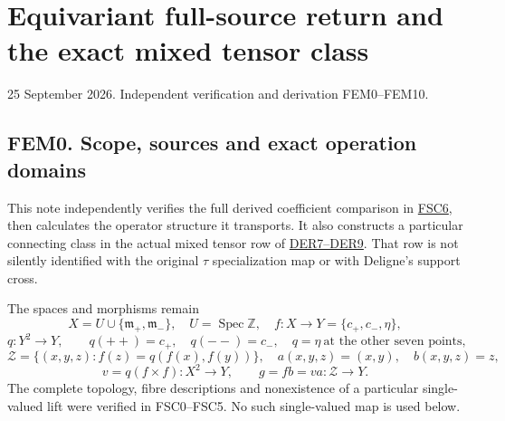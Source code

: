 \chapter{Equivariant full-source return and the exact mixed tensor
class}\label{equivariant-full-source-return-and-the-exact-mixed-tensor-class}

25 September 2026. Independent verification and derivation FEM0--FEM10.

\section{FEM0. Scope, sources and exact operation
domains}\label{fem0.-scope-sources-and-exact-operation-domains}

This note independently verifies the full derived coefficient comparison
in
\href{https://github.com/KokunoYumeto/zeta-function-research-reader/blob/main/workbenches/splitzero-tandem/continuations/20260925-full-source-tensor-and-original-divisor/counterfactual/DERIVED_RETURN_FULL_SOURCE_CORRESPONDENCE.md}{FSC6},
then calculates the operator structure it transports. It also constructs
a particular connecting class in the actual mixed tensor row of
\href{https://github.com/KokunoYumeto/zeta-function-research-reader/blob/main/workbenches/splitzero-tandem/continuations/20260925-full-source-tensor-and-original-divisor/counterfactual/DIAGONAL_EXTRAORDINARY_RETURN.md}{DER7--DER9}.
That row is not silently identified with the original \(\tau\)
specialization map or with Deligne's support cross.

The spaces and morphisms remain \[
X=U\cup\{\mathfrak m_+,\mathfrak m_-\},\quad U=\operatorname{Spec}\mathbb Z,
\quad f:X\to Y=\{c_+,c_-,\eta\},
\] \[
q:Y^2\to Y,\qquad q(++ )=c_+,\quad q(--)=c_-,
\quad q=\eta\ \text{at the other seven points},
\] \[
\mathcal Z=\{(x,y,z):f(z)=q(f(x),f(y))\},\quad
a(x,y,z)=(x,y),\quad b(x,y,z)=z,
\] \[
v=q(f\times f):X^2\to Y,\qquad g=fb=va:\mathcal Z\to Y.
\] The complete topology, fibre descriptions and nonexistence of a
particular single-valued lift were verified in FSC0--FSC5. No such
single-valued map is used below.

